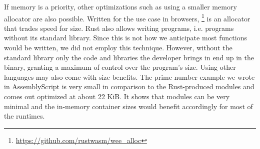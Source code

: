 If memory is a priority, other optimizations such as using a smaller memory allocator are also possible. Written for the use case in browsers, \footnote{\url{https://github.com/rustwasm/wee_alloc}} is an allocator that trades speed for size. Rust also allows writing  programs, i.e. programs without its standard library. Since this is not how we anticipate most functions would be written, we did not employ this technique. However, without the standard library only the code and libraries the developer brings in end up in the binary, granting a maximum of control over the program's size.
Using other languages may also come with size benefits. The prime number example we wrote in AssemblyScript is very small in comparison to the Rust-produced modules and comes out optimized at about 22 KiB. It shows that modules can be very minimal and the in-memory container sizes would benefit accordingly for most of the runtimes.


